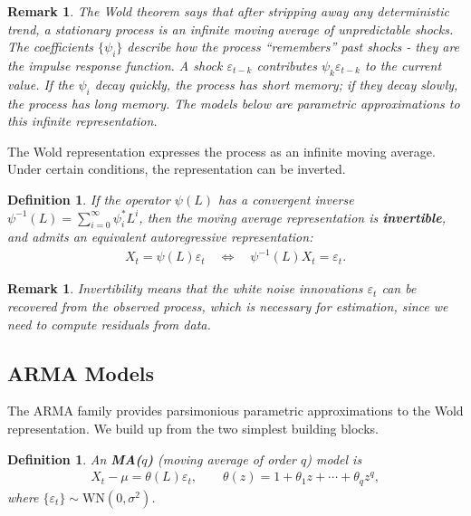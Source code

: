 \documentclass{report}
\theoremstyle{spacedplain}
\theoremstyle{spaceddefinition}
\newtheorem{definition}[theorem]{Definition}
\theoremstyle{spacedremark}
\newtheorem{remark}[theorem]{Remark}
\begin{document}
\begin{remark}
The Wold theorem says that after stripping away any deterministic trend, a stationary process is an infinite moving average of unpredictable shocks. The coefficients $\{\psi_i\}$ describe how the process ``remembers'' past shocks - they are the impulse response function. A shock $\varepsilon_{t-k}$ contributes $\psi_k \varepsilon_{t-k}$ to the current value. If the $\psi_i$ decay quickly, the process has short memory; if they decay slowly, the process has long memory. The models below are parametric approximations to this infinite representation.
\end{remark}

The Wold representation expresses the process as an infinite moving average. Under certain conditions, the representation can be inverted.

\begin{definition}
If the operator $\psi(L)$ has a convergent inverse $\psi^{-1}(L) = \sum_{i=0}^{\infty} \psi_i^* L^i$, then the moving average representation is \textbf{invertible}, and admits an equivalent autoregressive representation:
\begin{align}
    X_t = \psi(L)\varepsilon_t \quad \Longleftrightarrow \quad \psi^{-1}(L) X_t = \varepsilon_t.
\end{align}
\end{definition}

\begin{remark}
Invertibility means that the white noise innovations $\varepsilon_t$ can be recovered from the observed process, which is necessary for estimation, since we need to compute residuals from data.
\end{remark}


\subsection{ARMA Models}

The ARMA family provides parsimonious parametric approximations to the Wold representation. We build up from the two simplest building blocks.

\begin{definition}
An \textbf{MA($q$)} (moving average of order $q$) model is
\begin{align}
    X_t - \mu = \theta(L)\varepsilon_t, \qquad \theta(z) = 1 + \theta_1 z + \cdots + \theta_q z^q,
\end{align}
where $\{\varepsilon_t\} \sim \text{WN}(0, \sigma^2)$.
\end{definition}
\end{document}
